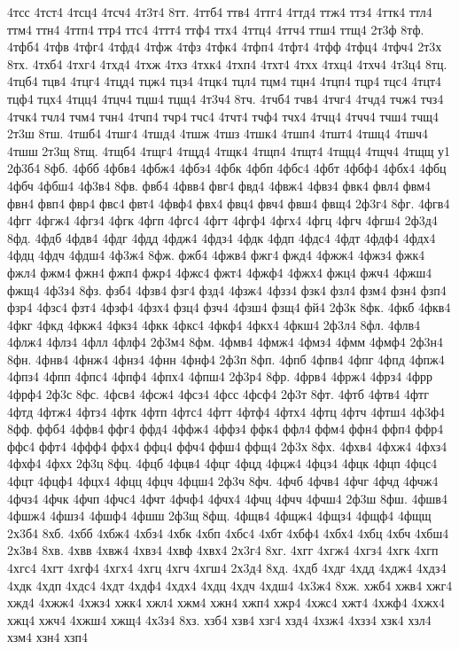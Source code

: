 {4тсс
4тст4
4тсц4
4тсч4
4т3т4
8тт.
4ттб4
ттв4
4ттг4
4ттд4
ттж4
ттз4
4ттк4
ттл4
ттм4
ттн4
4ттп4
ттр4
ттс4
4ттт4
ттф4
ттх4
4ттц4
4ттч4
ттш4
ттщ4
2т3ф
8тф.
4тфб4
4тфв
4тфг4
4тфд4
4тфж
4тфз
4тфк4
4тфп4
4тфт4
4тфф
4тфц4
4тфч4
2т3х
8тх.
4тхб4
4тхг4
4тхд4
4тхж
4тхз
4тхк4
4тхп4
4тхт4
4тхх
4тхц4
4тхч4
4т3ц4
8тц.
4тцб4
тцв4
4тцг4
4тцд4
тцж4
тцз4
4тцк4
тцл4
тцм4
тцн4
4тцп4
тцр4
тцс4
4тцт4
тцф4
тцх4
4тцц4
4тцч4
тцш4
тцщ4
4т3ч4
8тч.
4тчб4
тчв4
4тчг4
4тчд4
тчж4
тчз4
4тчк4
тчл4
тчм4
тчн4
4тчп4
тчр4
тчс4
4тчт4
тчф4
тчх4
4тчц4
4тчч4
тчш4
тчщ4
2т3ш
8тш.
4тшб4
4тшг4
4тшд4
4тшж
4тшз
4тшк4
4тшп4
4тшт4
4тшц4
4тшч4
4тшш
2т3щ
8тщ.
4тщб4
4тщг4
4тщд4
4тщк4
4тщп4
4тщт4
4тщц4
4тщч4
4тщщ
у1
2ф3б4
8фб.
4фбб
4фбв4
4фбж4
4фбз4
4фбк
4фбп
4фбс4
4фбт
4фбф4
4фбх4
4фбц
4фбч
4фбш4
4ф3в4
8фв.
фвб4
4фвв4
фвг4
фвд4
4фвж4
4фвз4
фвк4
фвл4
фвм4
фвн4
фвп4
фвр4
фвс4
фвт4
4фвф4
фвх4
фвц4
фвч4
фвш4
фвщ4
2ф3г4
8фг.
4фгв4
4фгг
4фгж4
4фгз4
4фгк
4фгп
4фгс4
4фгт
4фгф4
4фгх4
4фгц
4фгч
4фгш4
2ф3д4
8фд.
4фдб
4фдв4
4фдг
4фдд
4фдж4
4фдз4
4фдк
4фдп
4фдс4
4фдт
4фдф4
4фдх4
4фдц
4фдч
4фдш4
4ф3ж4
8фж.
фжб4
4фжв4
фжг4
фжд4
4фжж4
4фжз4
фжк4
фжл4
фжм4
фжн4
фжп4
фжр4
4фжс4
фжт4
4фжф4
4фжх4
фжц4
фжч4
4фжш4
фжщ4
4ф3з4
8фз.
фзб4
4фзв4
фзг4
фзд4
4фзж4
4фзз4
фзк4
фзл4
фзм4
фзн4
фзп4
фзр4
4фзс4
фзт4
4фзф4
4фзх4
фзц4
фзч4
4фзш4
фзщ4
фй4
2ф3к
8фк.
4фкб
4фкв4
4фкг
4фкд
4фкж4
4фкз4
4фкк
4фкс4
4фкф4
4фкх4
4фкш4
2ф3л4
8фл.
4флв4
4флж4
4флз4
4флл
4флф4
2ф3м4
8фм.
4фмв4
4фмж4
4фмз4
4фмм
4фмф4
2ф3н4
8фн.
4фнв4
4фнж4
4фнз4
4фнн
4фнф4
2ф3п
8фп.
4фпб
4фпв4
4фпг
4фпд
4фпж4
4фпз4
4фпп
4фпс4
4фпф4
4фпх4
4фпш4
2ф3р4
8фр.
4фрв4
4фрж4
4фрз4
4фрр
4фрф4
2ф3с
8фс.
4фсв4
4фсж4
4фсз4
4фсс
4фсф4
2ф3т
8фт.
4фтб
4фтв4
4фтг
4фтд
4фтж4
4фтз4
4фтк
4фтп
4фтс4
4фтт
4фтф4
4фтх4
4фтц
4фтч
4фтш4
4ф3ф4
8фф.
ффб4
4ффв4
ффг4
ффд4
4ффж4
4ффз4
ффк4
ффл4
ффм4
ффн4
ффп4
ффр4
ффс4
ффт4
4ффф4
ффх4
ффц4
ффч4
ффш4
ффщ4
2ф3х
8фх.
4фхв4
4фхж4
4фхз4
4фхф4
4фхх
2ф3ц
8фц.
4фцб
4фцв4
4фцг
4фцд
4фцж4
4фцз4
4фцк
4фцп
4фцс4
4фцт
4фцф4
4фцх4
4фцц
4фцч
4фцш4
2ф3ч
8фч.
4фчб
4фчв4
4фчг
4фчд
4фчж4
4фчз4
4фчк
4фчп
4фчс4
4фчт
4фчф4
4фчх4
4фчц
4фчч
4фчш4
2ф3ш
8фш.
4фшв4
4фшж4
4фшз4
4фшф4
4фшш
2ф3щ
8фщ.
4фщв4
4фщж4
4фщз4
4фщф4
4фщщ
2х3б4
8хб.
4хбб
4хбж4
4хбз4
4хбк
4хбп
4хбс4
4хбт
4хбф4
4хбх4
4хбц
4хбч
4хбш4
2х3в4
8хв.
4хвв
4хвж4
4хвз4
4хвф
4хвх4
2х3г4
8хг.
4хгг
4хгж4
4хгз4
4хгк
4хгп
4хгс4
4хгт
4хгф4
4хгх4
4хгц
4хгч
4хгш4
2х3д4
8хд.
4хдб
4хдг
4хдд
4хдж4
4хдз4
4хдк
4хдп
4хдс4
4хдт
4хдф4
4хдх4
4хдц
4хдч
4хдш4
4х3ж4
8хж.
хжб4
хжв4
хжг4
хжд4
4хжж4
4хжз4
хжк4
хжл4
хжм4
хжн4
хжп4
хжр4
4хжс4
хжт4
4хжф4
4хжх4
хжц4
хжч4
4хжш4
хжщ4
4х3з4
8хз.
хзб4
хзв4
хзг4
хзд4
4хзж4
4хзз4
хзк4
хзл4
хзм4
хзн4
хзп4
}
